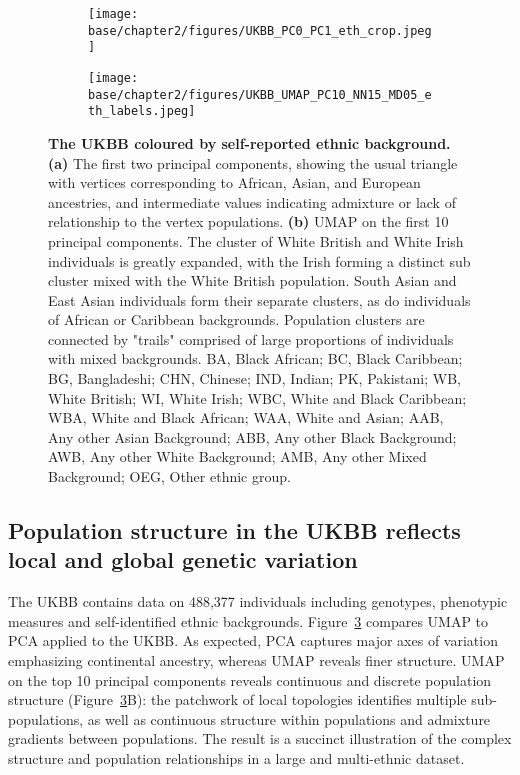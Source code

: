 \clearpage

\begin{figure}%
\centering
\begin{subfigure}{.5\columnwidth}
\texttt{[image: base/chapter2/figures/UKBB\_PC0\_PC1\_eth\_crop.jpeg]}
\caption{}%
\label{fig:pc_ukbb}%
\end{subfigure}\hfill%
\begin{subfigure}{.5\columnwidth}
\texttt{[image: base/chapter2/figures/UKBB\_UMAP\_PC10\_NN15\_MD05\_eth\_labels.jpeg]}%
\caption{}
\label{fig:umap_ukbb_pc10}
\end{subfigure}%
\caption[The UKBB coloured by self-reported ethnic background]{\textbf{The UKBB coloured by self-reported ethnic background.} \textbf{(a)} The first two principal components, showing the usual triangle with vertices corresponding to African, Asian, and European ancestries, and intermediate values indicating admixture or lack of relationship to the vertex populations. \textbf{(b)} UMAP on the first 10 principal components. The cluster of White British and White Irish individuals is greatly expanded, with the Irish forming a distinct sub cluster mixed with the White British population. South Asian and East Asian individuals form their separate clusters, as do individuals of African or Caribbean backgrounds. Population clusters are connected by "trails" comprised of large proportions of individuals with mixed backgrounds.
BA, Black African; 
BC, Black Caribbean; 
BG, Bangladeshi; 
CHN, Chinese; 
IND, Indian;
PK, Pakistani;
WB, White British;
WI, White Irish;
WBC, White and Black Caribbean; 
WBA, White and Black African; 
WAA, White and Asian;
AAB, Any other Asian Background; 
ABB, Any other Black Background;
AWB, Any other White Background;
AMB, Any other Mixed Background;
OEG, Other ethnic group.
}
\label{fig:fig3}
\end{figure}

\clearpage

\subsection{Population structure in the UKBB reflects local and global genetic variation}

The UKBB contains data on 488,377 individuals including genotypes, phenotypic measures and self-identified ethnic backgrounds. Figure~\ref{fig:fig3} compares UMAP to PCA applied to the UKBB. As expected, PCA captures major axes of variation emphasizing continental ancestry, whereas UMAP reveals finer structure. UMAP on the top 10 principal components reveals continuous and discrete population structure (Figure~\ref{fig:fig3}B): the patchwork of local topologies identifies multiple sub-populations, as well as continuous structure within populations and admixture gradients between populations. The result is a succinct illustration of the complex structure and population relationships in a large and multi-ethnic dataset.

